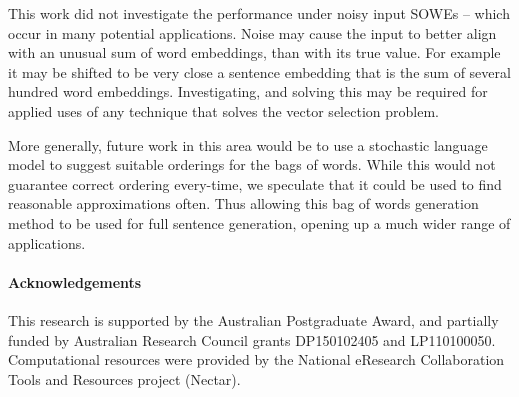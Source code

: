 \documentclass{book}
\begin{document}
This work did not investigate the performance under noisy input SOWEs -- which occur in many potential applications. Noise may cause the input to better align with an unusual sum of word embeddings, than with its true value. For example it may be shifted to be very close a sentence embedding that is the sum of several hundred word embeddings. Investigating, and solving this may be required for applied uses of any technique that solves the vector selection problem.

More generally, future work in this area would be to use a stochastic language model to suggest suitable orderings for the bags of words. While this would not guarantee correct ordering every-time, we speculate that it could be used to find reasonable approximations often. Thus allowing this bag of words generation method to be used for full sentence generation, opening up a much wider range of applications.

\paragraph{Acknowledgements}
This research is supported by the Australian Postgraduate
Award, and partially funded by Australian Research Council grants
DP150102405 and LP110100050. Computational resources were provided by the National eResearch Collaboration Tools and Resources project (Nectar).

\printbibliography
\end{document}
